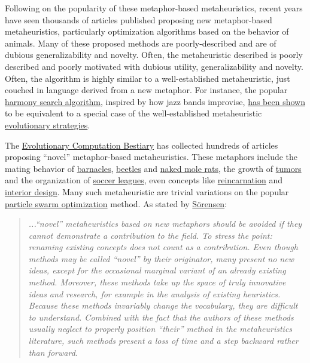 \documentclass[letterpaper, 12pt]{article}
\begin{document}
Following on the popularity of these metaphor-based metaheuristics, recent years have seen thousands of articles published proposing new metaphor-based metaheuristics, particularly optimization algorithms based on the behavior of animals. Many of these proposed methods are poorly-described and are of dubious generalizability and novelty. Often, the metaheuristic described is poorly described and poorly motivated with dubious utility, generalizability and novelty. Often, the algorithm is highly similar to a well-established metaheuristic, just couched in language derived from a new metaphor. For instance, the popular \href{https://doi.org/10.1177/003754970107600201}{harmony search algorithm}, inspired by how jazz bands improvise, \href{https://doi.org/10.4018/978-1-4666-0270-0.ch005}{has been shown} to be equivalent to a special case of the well-established metaheuristic \href{https://en.wikipedia.org/wiki/Evolution_strategy}{evolutionary strategies}.

The \href{https://fcampelo.github.io/EC-Bestiary/}{Evolutionary Computation Bestiary} has collected hundreds of articles proposing ``novel'' metaphor-based metaheuristics. These metaphors include the mating behavior of \href{https://doi.org/10.1007/978-981-13-3708-6_18}{barnacles}, \href{https://doi.org/10.1088/1757-899x/782/5/052028}{beetles} and \href{https://doi.org/10.1007/s00521-019-04464-7}{naked mole rats}, the growth of \href{https://doi.org/10.1016/j.asoc.2015.07.045}{tumors} and the organization of \href{http://dx.doi.org/10.4236/ijis.2014.41002}{soccer leagues}, even concepts like \href{https://doi.org/10.1109/CINTI.2010.5672231}{reincarnation} and \href{https://doi.org/10.1016/j.isatra.2014.03.018}{interior design}. Many such metaheuristic are trivial variations on the popular \href{https://en.wikipedia.org/wiki/Particle_swarm_optimization}{particle swarm optimization} method. As stated by \href{https://doi.org/10.1111/itor.12001}{S\"orensen}:

\begin{quote}
    \textit{...``novel'' metaheuristics based on new metaphors should be avoided if they cannot demonstrate a contribution to the field. To stress the point: renaming existing concepts does not count as a contribution. Even though methods may be called ``novel'' by their originator, many present no new ideas, except for the occasional marginal variant of an already existing method. Moreover, these methods take up the space of truly innovative ideas and research, for example in the analysis of existing heuristics. Because these methods invariably change the vocabulary, they are difficult to understand. Combined with the fact that the authors of these methods usually neglect to properly position ``their'' method in the metaheuristics literature, such methods present a loss of time and a step backward rather than forward.}
\end{quote}
\end{document}
